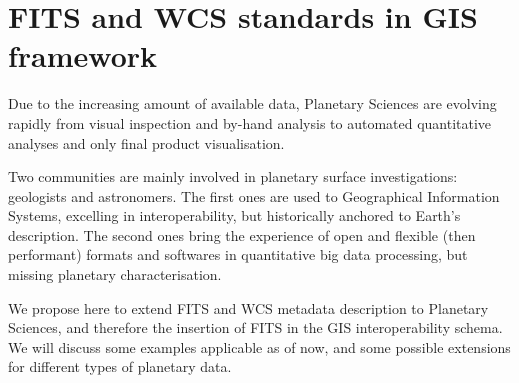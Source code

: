 \documentclass[11pt]{article}
\begin{document}
\section*{FITS and WCS standards in GIS framework}
Due to the increasing amount of available data, Planetary Sciences are evolving rapidly from visual inspection and by-hand analysis to automated
quantitative analyses and only final product visualisation.

Two communities are mainly involved in planetary surface investigations: geologists and astronomers.
The first ones are used to Geographical Information Systems, excelling in interoperability, but historically anchored to Earth's description.
The second ones bring the experience of open and flexible (then performant) formats and softwares in quantitative big data processing, but missing planetary
characterisation.

We propose here to extend FITS and WCS metadata description to Planetary Sciences, and therefore the insertion of FITS in the GIS interoperability schema.
We will discuss some examples applicable as of now, and some possible extensions for different types of planetary data. 
\end{document}
